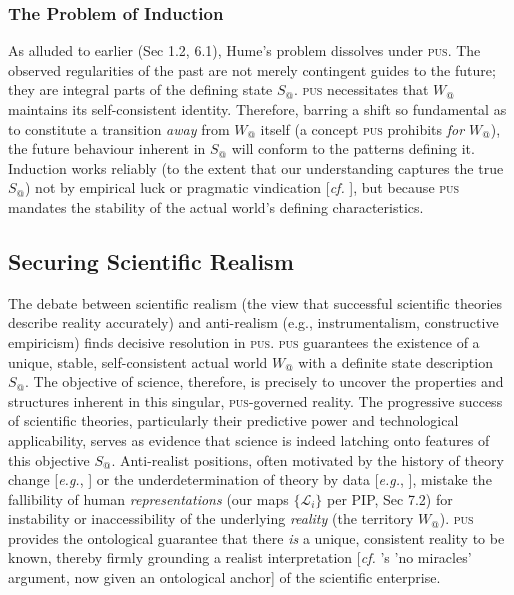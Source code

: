 \documentclass[11pt, a4paper]{article}
\makeatletter
\newcommand{\pus}{\textsc{pus}} %
\newcommand{\Wactual}{W_{@}} %
\newcommand{\Sactual}{S_{@}} %
\newcommand{\LangSet}{\{\mathcal{L}_i\}} %
\makeatother
\begin{document}
\subsubsection{The Problem of Induction}
As alluded to earlier (Sec 1.2, 6.1), Hume's problem dissolves under \pus. The observed regularities of the past are not merely contingent guides to the future; they are integral parts of the defining state $\Sactual$. \pus{} necessitates that $\Wactual$ maintains its self-consistent identity. Therefore, barring a shift so fundamental as to constitute a transition \textit{away} from $\Wactual$ itself (a concept \pus{} prohibits \textit{for $\Wactual$}), the future behaviour inherent in $\Sactual$ will conform to the patterns defining it. Induction works reliably (to the extent that our understanding captures the true $\Sactual$) not by empirical luck or pragmatic vindication [\textit{cf.} \citealp{reichenbach1938}], but because \pus{} mandates the stability of the actual world's defining characteristics.

\subsection{Securing Scientific Realism}
The debate between scientific realism (the view that successful scientific theories describe reality accurately) and anti-realism (e.g., instrumentalism, constructive empiricism) finds decisive resolution in \pus. \pus{} guarantees the existence of a unique, stable, self-consistent actual world $\Wactual$ with a definite state description $\Sactual$. The objective of science, therefore, is precisely to uncover the properties and structures inherent in this singular, \pus-governed reality. The progressive success of scientific theories, particularly their predictive power and technological applicability, serves as evidence that science is indeed latching onto features of this objective $\Sactual$. Anti-realist positions, often motivated by the history of theory change [\textit{e.g.}, \citealp{laudan1981}] or the underdetermination of theory by data [\textit{e.g.}, \citealp{vanfraassen1980}], mistake the fallibility of human \textit{representations} (our maps $\LangSet$ per PIP, Sec 7.2) for instability or inaccessibility of the underlying \textit{reality} (the territory $\Wactual$). \pus{} provides the ontological guarantee that there \textit{is} a unique, consistent reality to be known, thereby firmly grounding a realist interpretation [\textit{cf.} \citealp{putnam1975}'s 'no miracles' argument, now given an ontological anchor] of the scientific enterprise.
\end{document}
